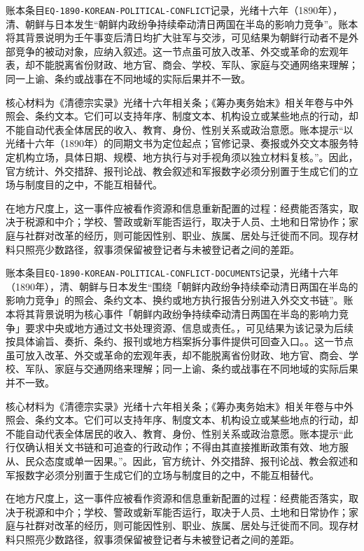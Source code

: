 账本条目\texttt{EQ-1890-KOREAN-POLITICAL-CONFLICT}记录，光绪十六年（1890年），清、朝鲜与日本发生“朝鲜内政纷争持续牵动清日两国在半岛的影响力竞争”。账本将其背景说明为壬午事变后清日均扩大驻军与交涉，可见结果为朝鲜行动者不是外部竞争的被动对象，应纳入叙述。这一节点虽可放入改革、外交或革命的宏观年表，却不能脱离省份财政、地方官、商会、学校、军队、家庭与交通网络来理解；同一上谕、条约或战事在不同地域的实际后果并不一致。

核心材料为《清德宗实录》光绪十六年相关条；《筹办夷务始末》相关年卷与中外照会、条约文本。它们可以支持年序、制度文本、机构设立或某些地点的行动，却不能自动代表全体居民的收入、教育、身份、性别关系或政治意愿。账本提示“以光绪十六年（1890年）的同期文书为定位起点；官修记录、奏报或外交文本服务特定机构立场，具体日期、规模、地方执行与对手视角须以独立材料复核。”。因此，官方统计、外交措辞、报刊论战、教会叙述和军报数字必须分别置于生成它们的立场与制度目的之中，不能互相替代。

在地方尺度上，这一事件应被看作资源和信息重新配置的过程：经费能否落实，取决于税源和中介；学校、警政或新军能否运行，取决于人员、土地和日常协作；家庭与社群对改革的经历，则可能因性别、职业、族属、居处与迁徙而不同。现存材料只照亮少数路径，叙事须保留被登记者与未被登记者之间的差距。

账本条目\texttt{EQ-1890-KOREAN-POLITICAL-CONFLICT-DOCUMENTS}记录，光绪十六年（1890年），清、朝鲜与日本发生“围绕「朝鲜内政纷争持续牵动清日两国在半岛的影响力竞争」的照会、条约文本、换约或地方执行报告分别进入外交文书链”。账本将其背景说明为核心事件「朝鲜内政纷争持续牵动清日两国在半岛的影响力竞争」要求中央或地方通过文书处理资源、信息或责任。，可见结果为该记录为后续按具体谕旨、奏折、条约、报刊或地方档案拆分事件提供可回查入口。。这一节点虽可放入改革、外交或革命的宏观年表，却不能脱离省份财政、地方官、商会、学校、军队、家庭与交通网络来理解；同一上谕、条约或战事在不同地域的实际后果并不一致。

核心材料为《清德宗实录》光绪十六年相关条；《筹办夷务始末》相关年卷与中外照会、条约文本。它们可以支持年序、制度文本、机构设立或某些地点的行动，却不能自动代表全体居民的收入、教育、身份、性别关系或政治意愿。账本提示“此行仅确认相关文书链和可追查的行政动作；不得由其直接推断政策有效、地方服从、民众态度或单一因果。”。因此，官方统计、外交措辞、报刊论战、教会叙述和军报数字必须分别置于生成它们的立场与制度目的之中，不能互相替代。

在地方尺度上，这一事件应被看作资源和信息重新配置的过程：经费能否落实，取决于税源和中介；学校、警政或新军能否运行，取决于人员、土地和日常协作；家庭与社群对改革的经历，则可能因性别、职业、族属、居处与迁徙而不同。现存材料只照亮少数路径，叙事须保留被登记者与未被登记者之间的差距。

